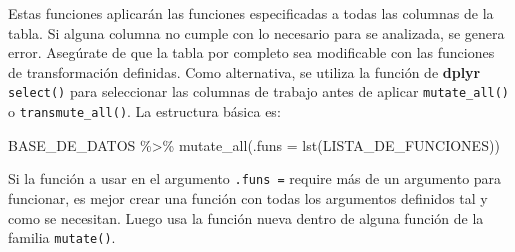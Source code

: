 \documentclass[
]{article}
\newenvironment{Shaded}{\begin{snugshade}}{\end{snugshade}}
\newcommand{\AttributeTok}[1]{\textcolor[rgb]{0.77,0.63,0.00}{#1}}
\newcommand{\FunctionTok}[1]{\textcolor[rgb]{0.00,0.00,0.00}{#1}}
\newcommand{\NormalTok}[1]{#1}
\newcommand{\SpecialCharTok}[1]{\textcolor[rgb]{0.00,0.00,0.00}{#1}}
\theoremstyle{definition}
\theoremstyle{definition}
\theoremstyle{definition}
\theoremstyle{definition}
\theoremstyle{remark}
\begin{document}
Estas funciones aplicarán las funciones especificadas a todas las columnas de la tabla. Si alguna columna no cumple con lo necesario para se analizada, se genera error. Asegúrate de que la tabla por completo sea modificable con las funciones de transformación definidas. Como alternativa, se utiliza la función de \textbf{dplyr} \texttt{select()} para seleccionar las columnas de trabajo antes de aplicar \texttt{mutate\_all()} o \texttt{transmute\_all()}. La estructura básica es:

\begin{Shaded}
\begin{Highlighting}[]
\NormalTok{BASE\_DE\_DATOS }\SpecialCharTok{\%\textgreater{}\%} 
  \FunctionTok{mutate\_all}\NormalTok{(}\AttributeTok{.funs =} \FunctionTok{lst}\NormalTok{(LISTA\_DE\_FUNCIONES))}
\end{Highlighting}
\end{Shaded}

\begin{rmdnote}
Si la función a usar en el argumento \texttt{.funs\ =} require más de un argumento para funcionar, es mejor crear una función con todas los argumentos definidos tal y como se necesitan. Luego usa la función nueva dentro de alguna función de la familia \texttt{mutate()}.\\
\end{rmdnote}
\end{document}
